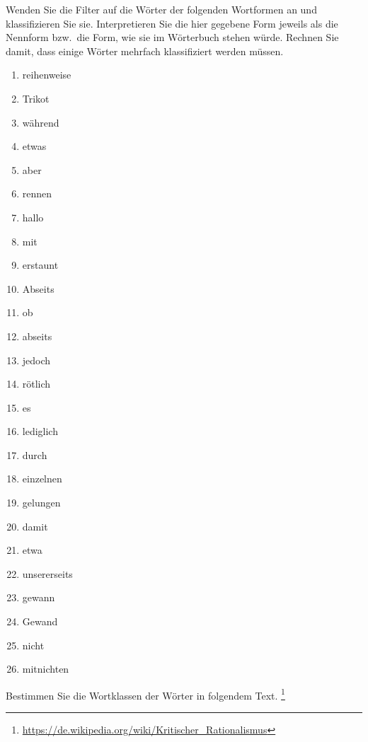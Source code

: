 \Uebung \label{u55} Wenden Sie die Filter auf die Wörter der folgenden Wortformen an und klassifizieren Sie sie.
Interpretieren Sie die hier gegebene Form jeweils als die Nennform bzw.\ die Form, wie sie im Wörterbuch stehen würde.
Rechnen Sie damit, dass einige Wörter mehrfach klassifiziert werden müssen.

\begin{enumerate}\Lf
  \item reihenweise
  \item Trikot
  \item während
  \item etwas
  \item aber
  \item rennen
  \item hallo
  \item mit
  \item erstaunt
  \item Abseits
  \item ob
  \item abseits
  \item jedoch
  \item rötlich
  \item es
  \item lediglich
  \item durch
  \item einzelnen
  \item gelungen
  \item damit
  \item etwa
  \item unsererseits
  \item gewann
  \item Gewand
  \item nicht
  \item mitnichten
\end{enumerate}

\Uebung \label{u56} Bestimmen Sie die Wortklassen der Wörter in folgendem Text.%
\footnote{\url{https://de.wikipedia.org/wiki/Kritischer_Rationalismus}}

